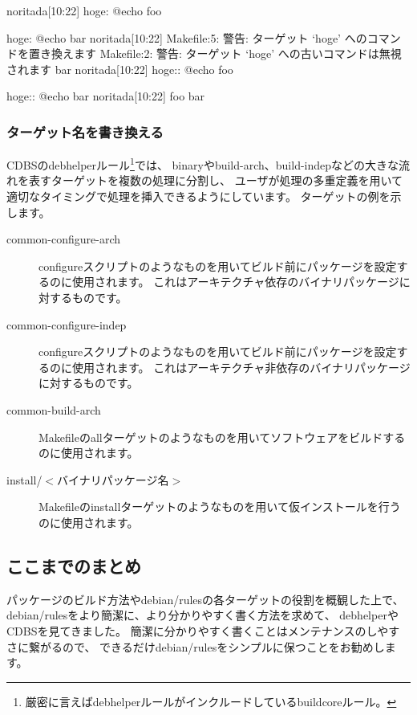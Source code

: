 \documentclass[mingoth,a4paper]{jsarticle}
\begin{document}
\begin{commandline}
noritada[10:22]%
hoge:
        @echo foo

hoge:
	@echo bar
noritada[10:22]%
Makefile:5: 警告: ターゲット `hoge' へのコマンドを置き換えます
Makefile:2: 警告: ターゲット `hoge' への古いコマンドは無視されます
bar
noritada[10:22]%
hoge::
	@echo foo

hoge::
	@echo bar
noritada[10:22]%
foo
bar
\end{commandline}

\subsubsection{ターゲット名を書き換える}

CDBSのdebhelperルール\footnote{厳密に言えばdebhelperルールがインクルードしているbuildcoreルール。}では、
binaryやbuild-arch、build-indepなどの大きな流れを表すターゲットを複数の処理に分割し、
ユーザが処理の多重定義を用いて適切なタイミングで処理を挿入できるようにしています。
ターゲットの例を示します。

\begin{description}
 \item[common-configure-arch]
    configureスクリプトのようなものを用いてビルド前にパッケージを設定するのに使用されます。
    これはアーキテクチャ依存のバイナリパッケージに対するものです。
 \item[common-configure-indep]
    configureスクリプトのようなものを用いてビルド前にパッケージを設定するのに使用されます。
    これはアーキテクチャ非依存のバイナリパッケージに対するものです。
 \item[common-build-arch]
    Makefileのallターゲットのようなものを用いてソフトウェアをビルドするのに使用されます。
 \item[install/$<$バイナリパッケージ名$>$]
    Makefileのinstallターゲットのようなものを用いて仮インストールを行うのに使用されます。
\end{description}

\subsection{ここまでのまとめ}

パッケージのビルド方法やdebian/rulesの各ターゲットの役割を概観した上で、
debian/rulesをより簡潔に、より分かりやすく書く方法を求めて、
debhelperやCDBSを見てきました。
簡潔に分かりやすく書くことはメンテナンスのしやすさに繋がるので、
できるだけdebian/rulesをシンプルに保つことをお勧めします。
\end{document}
